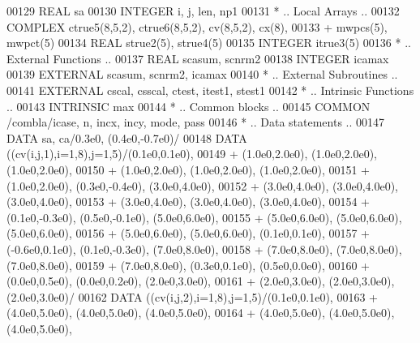 \begin{DoxyCode}
00129       \textcolor{keywordtype}{REAL}              sa
00130       \textcolor{keywordtype}{INTEGER}           i, j, len, np1
00131 \textcolor{comment}{*     .. Local Arrays ..}
00132       \textcolor{keywordtype}{COMPLEX}           ctrue5(8,5,2), ctrue6(8,5,2), cv(8,5,2), cx(8),
00133      +                  mwpcs(5), mwpct(5)
00134       \textcolor{keywordtype}{REAL}              strue2(5), strue4(5)
00135       \textcolor{keywordtype}{INTEGER}           itrue3(5)
00136 \textcolor{comment}{*     .. External Functions ..}
00137       \textcolor{keywordtype}{REAL}              scasum, scnrm2
00138       \textcolor{keywordtype}{INTEGER}           icamax
00139       \textcolor{keywordtype}{EXTERNAL}          scasum, scnrm2, icamax
00140 \textcolor{comment}{*     .. External Subroutines ..}
00141       \textcolor{keywordtype}{EXTERNAL}          cscal, csscal, ctest, itest1, stest1
00142 \textcolor{comment}{*     .. Intrinsic Functions ..}
00143       \textcolor{keywordtype}{INTRINSIC}         max
00144 \textcolor{comment}{*     .. Common blocks ..}
00145       \textcolor{keyword}{COMMON}            /combla/icase, n, incx, incy, mode, pass
00146 \textcolor{comment}{*     .. Data statements ..}
00147       \textcolor{keyword}{DATA}              sa, ca/0.3e0, (0.4e0,-0.7e0)/
00148       \textcolor{keyword}{DATA}              ((cv(i,j,1),i=1,8),j=1,5)/(0.1e0,0.1e0),
00149      +                  (1.0e0,2.0e0), (1.0e0,2.0e0), (1.0e0,2.0e0),
00150      +                  (1.0e0,2.0e0), (1.0e0,2.0e0), (1.0e0,2.0e0),
00151      +                  (1.0e0,2.0e0), (0.3e0,-0.4e0), (3.0e0,4.0e0),
00152      +                  (3.0e0,4.0e0), (3.0e0,4.0e0), (3.0e0,4.0e0),
00153      +                  (3.0e0,4.0e0), (3.0e0,4.0e0), (3.0e0,4.0e0),
00154      +                  (0.1e0,-0.3e0), (0.5e0,-0.1e0), (5.0e0,6.0e0),
00155      +                  (5.0e0,6.0e0), (5.0e0,6.0e0), (5.0e0,6.0e0),
00156      +                  (5.0e0,6.0e0), (5.0e0,6.0e0), (0.1e0,0.1e0),
00157      +                  (-0.6e0,0.1e0), (0.1e0,-0.3e0), (7.0e0,8.0e0),
00158      +                  (7.0e0,8.0e0), (7.0e0,8.0e0), (7.0e0,8.0e0),
00159      +                  (7.0e0,8.0e0), (0.3e0,0.1e0), (0.5e0,0.0e0),
00160      +                  (0.0e0,0.5e0), (0.0e0,0.2e0), (2.0e0,3.0e0),
00161      +                  (2.0e0,3.0e0), (2.0e0,3.0e0), (2.0e0,3.0e0)/
00162       \textcolor{keyword}{DATA}              ((cv(i,j,2),i=1,8),j=1,5)/(0.1e0,0.1e0),
00163      +                  (4.0e0,5.0e0), (4.0e0,5.0e0), (4.0e0,5.0e0),
00164      +                  (4.0e0,5.0e0), (4.0e0,5.0e0), (4.0e0,5.0e0),

\end{DoxyCode}

